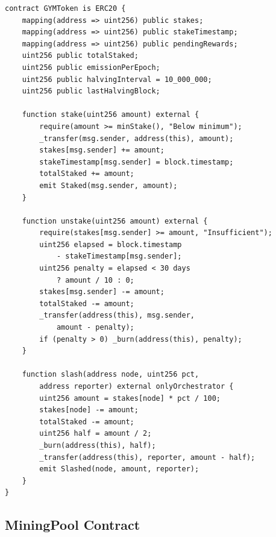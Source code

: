 \documentclass[11pt,letterpaper]{article}
\begin{document}
\begin{lstlisting}[language=Solidity,caption=GYM token with mining and staking]
contract GYMToken is ERC20 {
    mapping(address => uint256) public stakes;
    mapping(address => uint256) public stakeTimestamp;
    mapping(address => uint256) public pendingRewards;
    uint256 public totalStaked;
    uint256 public emissionPerEpoch;
    uint256 public halvingInterval = 10_000_000;
    uint256 public lastHalvingBlock;

    function stake(uint256 amount) external {
        require(amount >= minStake(), "Below minimum");
        _transfer(msg.sender, address(this), amount);
        stakes[msg.sender] += amount;
        stakeTimestamp[msg.sender] = block.timestamp;
        totalStaked += amount;
        emit Staked(msg.sender, amount);
    }

    function unstake(uint256 amount) external {
        require(stakes[msg.sender] >= amount, "Insufficient");
        uint256 elapsed = block.timestamp
            - stakeTimestamp[msg.sender];
        uint256 penalty = elapsed < 30 days
            ? amount / 10 : 0;
        stakes[msg.sender] -= amount;
        totalStaked -= amount;
        _transfer(address(this), msg.sender,
            amount - penalty);
        if (penalty > 0) _burn(address(this), penalty);
    }

    function slash(address node, uint256 pct,
        address reporter) external onlyOrchestrator {
        uint256 amount = stakes[node] * pct / 100;
        stakes[node] -= amount;
        totalStaked -= amount;
        uint256 half = amount / 2;
        _burn(address(this), half);
        _transfer(address(this), reporter, amount - half);
        emit Slashed(node, amount, reporter);
    }
}
\end{lstlisting}

\subsection{MiningPool Contract}
\end{document}
